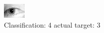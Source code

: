 \begin{figure}[h!]
\begin{center}
\includegraphics[width=0.60\columnwidth]{figures/ID1258_class_4_target_3.png}
\end{center}
\caption{ Classification: 4 actual target: 3}
\label{fig:ID1258_class_4_target_3}
\end{figure}
